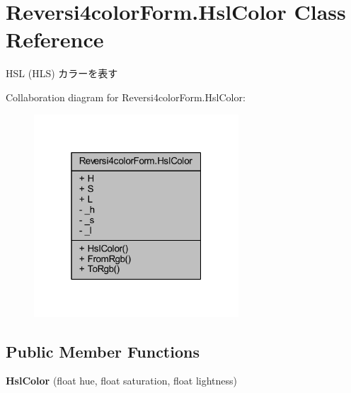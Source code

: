 \hypertarget{class_reversi4color_form_1_1_hsl_color}{}\section{Reversi4color\+Form.\+Hsl\+Color Class Reference}
\label{class_reversi4color_form_1_1_hsl_color}


H\+SL (H\+LS) カラーを表す  




Collaboration diagram for Reversi4color\+Form.\+Hsl\+Color\+:\nopagebreak
\begin{figure}[H]
\begin{center}
\leavevmode
\includegraphics[width=217pt]{class_reversi4color_form_1_1_hsl_color__coll__graph}
\end{center}
\end{figure}
\subsection*{Public Member Functions}
\begin{DoxyCompactItemize}
\item 
\mbox{\label{class_reversi4color_form_1_1_hsl_color_ad1bdb3fb711f7a0c5306ca92b3c189a3}} 
{\bfseries Hsl\+Color} (float hue, float saturation, float lightness)
\end{DoxyCompactItemize}
